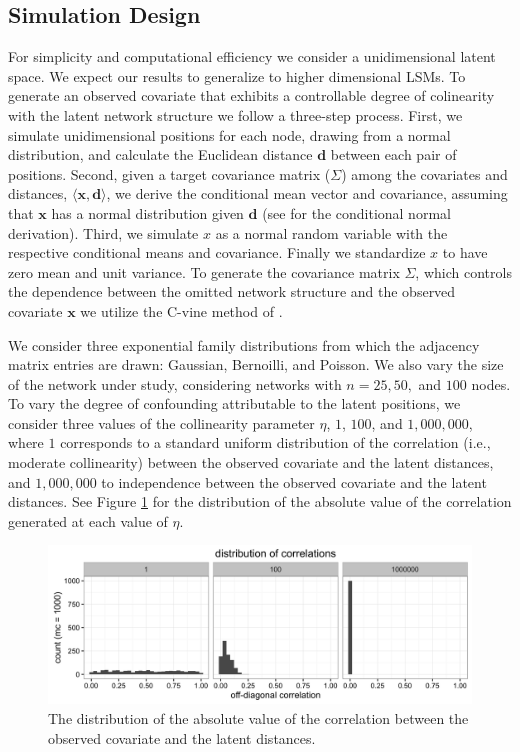 \documentclass[11pt]{article}
\begin{document}
\subsection{Simulation Design}

For simplicity and computational efficiency we consider a unidimensional latent space. We expect our results to generalize to higher dimensional LSMs. To generate an observed covariate that exhibits a controllable degree of colinearity with the latent network structure we follow a three-step process. First, we simulate unidimensional positions for each node, drawing from a normal distribution, and calculate the Euclidean distance $\mathbf{d}$ between each pair of positions. Second, given a target covariance matrix ($\Sigma$) among the covariates and distances, $\langle \mathbf{x}, \mathbf{d} \rangle$, we derive the conditional mean vector and covariance, assuming that $\mathbf{x}$ has a normal distribution given $\mathbf{d}$ (see \cite[pp. 116--117]{eaton1983} for the conditional normal derivation). Third, we simulate $x$ as a normal random variable with the respective conditional means and covariance. Finally we standardize $x$ to have zero mean and unit variance. To generate the covariance matrix $\Sigma$, which controls the dependence between the omitted network structure and the observed covariate $\mathbf{x}$ we utilize the C-vine method of \cite{lewandowski2009generating}. %

We consider three exponential family distributions from which the adjacency matrix entries are drawn: Gaussian, Bernoilli, and Poisson. We also vary the size of the network under study, considering networks with $n = 25, 50,$ and $100$ nodes. To vary the degree of confounding attributable to the latent positions, we consider three values of the collinearity parameter $\eta$, $1$, $100$, and $1,000,000$, where $1$ corresponds to a standard uniform distribution of the correlation  (i.e.,  moderate collinearity) between the observed covariate and the latent distances, and $1,000,000$ to independence between the observed covariate and the latent distances. See Figure \ref{fig:vine} for the distribution of the absolute value of the correlation generated at each value of $\eta$.

\begin{figure}
\includegraphics[width=\textwidth]{figures/max_r_vine.png}
\caption{The distribution of the absolute value of the correlation between the observed covariate and the latent distances. \label{fig:vine}}
\end{figure}
\end{document}
